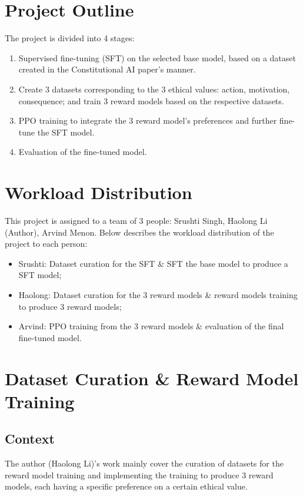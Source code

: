 \section{Project Outline}
The project is divided into 4 stages:
\begin{enumerate}
    \item Supervised fine-tuning (SFT) on the selected base model, based on a dataset created in the Constitutional AI paper's manner.
    \item Create 3 datasets corresponding to the 3 ethical values: action, motivation, consequence; and train 3 reward models based on the respective datasets.
    \item PPO training to integrate the 3 reward model's preferences and further fine-tune the SFT model.
    \item Evaluation of the fine-tuned model.
\end{enumerate}

\section{Workload Distribution}
This project is assigned to a team of 3 people: Srushti Singh, Haolong Li (Author), Arvind Menon. Below describes the workload distribution of the project to each person:
\begin{itemize}
    \item Srushti: Dataset curation for the SFT \& SFT the base model to produce a SFT model;
    \item Haolong: Dataset curation for the 3 reward models \& reward models training to produce 3 reward models;
    \item Arvind: PPO training from the 3 reward models \& evaluation of the final fine-tuned model.
\end{itemize}

\section{Dataset Curation \& Reward Model Training}

\subsection{Context}
The author (Haolong Li)'s work mainly cover the curation of datasets for the reward model training and implementing the training to produce 3 reward models, each having a specific preference on a certain ethical value.

